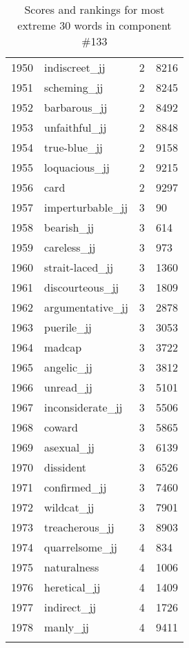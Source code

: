 \begin{longtable}[!htbp]{| rlr@{.}l |}
    1950 & indiscreet\_jj & 2 & 8216 \\
    1951 & scheming\_jj & 2 & 8245 \\
    1952 & barbarous\_jj & 2 & 8492 \\
    1953 & unfaithful\_jj & 2 & 8848 \\
    1954 & true-blue\_jj & 2 & 9158 \\
    1955 & loquacious\_jj & 2 & 9215 \\
    1956 & card & 2 & 9297 \\
    1957 & imperturbable\_jj & 3 & 90 \\
    1958 & bearish\_jj & 3 & 614 \\
    1959 & careless\_jj & 3 & 973 \\
    1960 & strait-laced\_jj & 3 & 1360 \\
    1961 & discourteous\_jj & 3 & 1809 \\
    1962 & argumentative\_jj & 3 & 2878 \\
    1963 & puerile\_jj & 3 & 3053 \\
    1964 & madcap & 3 & 3722 \\
    1965 & angelic\_jj & 3 & 3812 \\
    1966 & unread\_jj & 3 & 5101 \\
    1967 & inconsiderate\_jj & 3 & 5506 \\
    1968 & coward & 3 & 5865 \\
    1969 & asexual\_jj & 3 & 6139 \\
    1970 & dissident & 3 & 6526 \\
    1971 & confirmed\_jj & 3 & 7460 \\
    1972 & wildcat\_jj & 3 & 7901 \\
    1973 & treacherous\_jj & 3 & 8903 \\
    1974 & quarrelsome\_jj & 4 & 834 \\
    1975 & naturalness & 4 & 1006 \\
    1976 & heretical\_jj & 4 & 1409 \\
    1977 & indirect\_jj & 4 & 1726 \\
    1978 & manly\_jj & 4 & 9411 \\
    \hline
    \caption{Scores and rankings for most extreme 30 words in component \#133} \\
\end{longtable}
